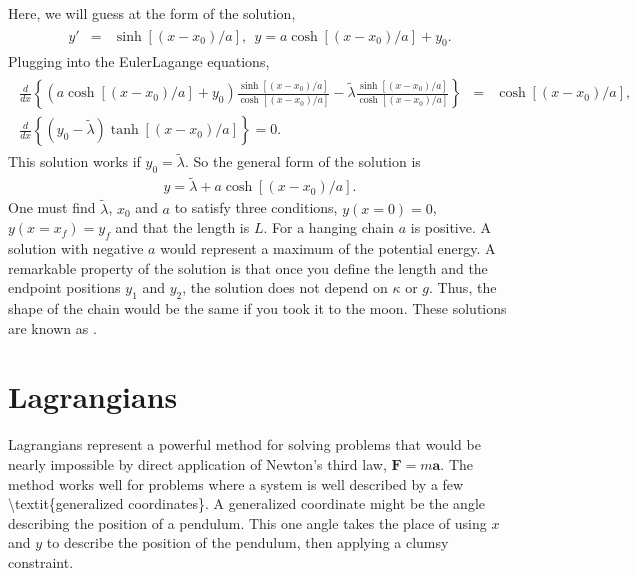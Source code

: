 \documentclass[letterpaper,10pt,english]{sphinxmanual}
\begin{document}
Here, we will guess at the form of the solution,
\begin{equation*}
\begin{split}
\begin{eqnarray*}
y'&=&\sinh[(x-x_0)/a],~~y=a\cosh[(x-x_0)/a]+y_0.
\end{eqnarray*}
\end{split}
\end{equation*}
Plugging into the Euler\sphinxhyphen{}Lagange equations,
\begin{equation*}
\begin{split}
\begin{eqnarray*}
\frac{d}{dx}\left\{(a\cosh[(x-x_0)/a]+y_0)\frac{\sinh[(x-x_0)/a]}{\cosh[(x-x_0)/a]}-\tilde{\lambda}\frac{\sinh[(x-x_0)/a]}{\cosh[(x-x_0)/a]}\right\}&=&\cosh[(x-x_0)/a],\\
\nonumber
\frac{d}{dx}\left\{(y_0-\tilde{\lambda})\tanh[(x-x_0)/a]\right\}=0.
\end{eqnarray*}
\end{split}
\end{equation*}
This solution works if \(y_0=\tilde{\lambda}\). So the general form of
the solution is
\begin{equation*}
\begin{split}
y=\tilde{\lambda}+a\cosh[(x-x_0)/a].
\end{split}
\end{equation*}
One must find \(\tilde{\lambda}\), \(x_0\) and \(a\) to satisfy three
conditions, \(y(x=0)=0\), \(y(x=x_f)=y_f\) and that the length is \(L\). For
a hanging chain \(a\) is positive. A solution with negative \(a\) would
represent a maximum of the potential energy. A remarkable property of
the solution is that once you define the length and the end\sphinxhyphen{}point
positions \(y_1\) and \(y_2\), the solution does not depend on \(\kappa\) or
\(g\). Thus, the shape of the chain would be the same if you took it to
the moon. These solutions are known as .


\section{Lagrangians}
\label{\detokenize{chapter1:lagrangians}}
Lagrangians represent a powerful method for solving problems that
would be nearly impossible by direct application of Newton’s third
law, \(\boldsymbol{F}=m\boldsymbol{a}\). The method works well for problems where a
system is well described by a few \textbackslash{}textit\{generalized coordinates\}. A
generalized coordinate might be the angle describing the position of a
pendulum. This one angle takes the place of using \(x\) and \(y\) to
describe the position of the pendulum, then applying a clumsy
constraint.
\end{document}
